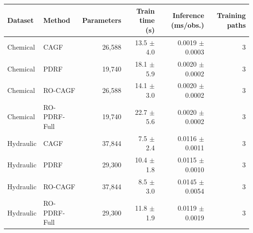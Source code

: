 \begin{tabular}{llrrrr}
\toprule
Dataset & Method & Parameters & Train time (s) & Inference (ms/obs.) & Training paths \\
\midrule
Chemical & CAGF & 26,588 & 13.5 $\pm$ 4.0 & 0.0019 $\pm$ 0.0003 & 3 \\
Chemical & PDRF & 19,740 & 18.1 $\pm$ 5.9 & 0.0020 $\pm$ 0.0002 & 3 \\
Chemical & RO-CAGF & 26,588 & 14.1 $\pm$ 3.0 & 0.0020 $\pm$ 0.0002 & 3 \\
Chemical & RO-PDRF-Full & 19,740 & 22.7 $\pm$ 5.6 & 0.0020 $\pm$ 0.0002 & 3 \\
Hydraulic & CAGF & 37,844 & 7.5 $\pm$ 2.4 & 0.0116 $\pm$ 0.0011 & 3 \\
Hydraulic & PDRF & 29,300 & 10.4 $\pm$ 1.8 & 0.0115 $\pm$ 0.0010 & 3 \\
Hydraulic & RO-CAGF & 37,844 & 8.5 $\pm$ 3.0 & 0.0145 $\pm$ 0.0054 & 3 \\
Hydraulic & RO-PDRF-Full & 29,300 & 11.8 $\pm$ 1.9 & 0.0119 $\pm$ 0.0019 & 3 \\
\bottomrule
\end{tabular}